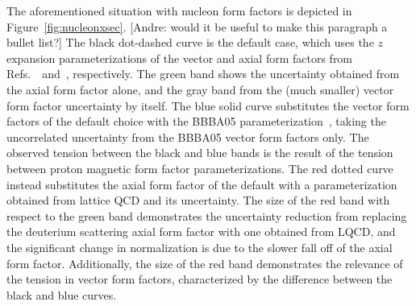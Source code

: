 The aforementioned situation with nucleon form factors is depicted in Figure~\ref{fig:nucleonxsec}.
{\color{red}[Andre: would it be useful to make this paragraph a bullet list?]}
The black dot-dashed curve is the default case, which uses the $z$ expansion parameterizations of the vector and axial form factors from Refs.~\cite{Borah:2020gte}~and~\cite{Meyer:2016oeg}, respectively.
The green band shows the uncertainty obtained from the axial form factor alone, and the gray band from the (much smaller) vector form factor uncertainty by itself.
The blue solid curve substitutes the vector form factors of the default choice with the BBBA05 parameterization~\cite{Bradford:2006yz}, taking the uncorrelated uncertainty from the BBBA05 vector form factors only.
The observed tension between the black and blue bands is the result of the tension between proton magnetic form factor parameterizations.
The red dotted curve instead substitutes the axial form factor of the default with a parameterization obtained from lattice QCD and its uncertainty.
The size of the red band with respect to the green band demonstrates the uncertainty reduction from replacing the deuterium scattering axial form factor with one obtained from LQCD, and the significant change in normalization is due to the slower fall off of the axial form factor.
Additionally, the size of the red band demonstrates the relevance of the tension in vector form factors, characterized by the difference between the black and blue curves.


